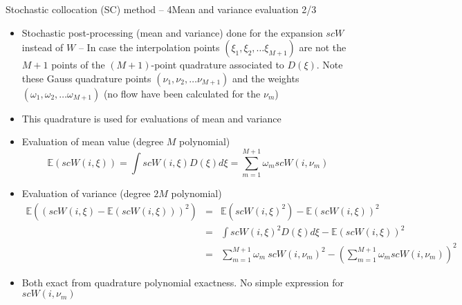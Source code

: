 \documentclass[10pt]{beamer}
\def\vr{\vspace{3mm}}
\def\begit{\begin{itemize}}
\def\endit{\end{itemize}}
\def\beas{\begin{eqnarray*}}
\def\eeas{\end{eqnarray*}}
\newcommand{\esp}{{\mathbb E}}
\begin{document}
\begin{frame}{Stochastic collocation (SC) method -- 4}{Mean and variance evaluation 2/3} 

\scriptsize{
\begit
\item Stochastic post-processing (mean and variance) done for the expansion $scW$ instead of $W$ -- In case the interpolation points $(\xi_1, \xi_2,\dots\xi_{M+1})$ are not the $M+1$ points of the $(M+1)$-point quadrature associated to $D(\xi)$. Note these Gauss quadrature points $(\nu_1, \nu_2,\dots\nu_{M+1})$ and the weights $(\omega_1, \omega_2,\dots\omega_{M+1})$ (no flow have been calculated for the $\nu_m$)
\item This quadrature is used for evaluations of mean and variance
\vr
\item Evaluation of mean value (degree $M$ polynomial)
     $$ \esp(scW(i,\xi)) = \int scW(i,\xi) D(\xi) d\xi = \sum_{m=1}^{M+1} \omega_m scW(i,\nu_m) $$
%
\item Evaluation of variance (degree $2M$ polynomial)
\beas
     \esp((scW(i,\xi)-\esp(scW(i,\xi)))^2)&=&   \esp(scW(i,\xi)^2) -\esp(scW(i,\xi))^2 \\
                 &=&   \int scW(i,\xi)^2 D(\xi)d\xi  -\esp(scW(i,\xi))^2      \\
                 &=&   \sum_{m=1}^{M+1} \omega_m \ scW(i,\nu_m)^2  - \left(\sum_{m=1}^{M+1} \omega_m scW(i, \nu_m)\right)^2
\eeas
\item Both exact from quadrature polynomial exactness. No simple expression for   $scW(i,\nu_m)$
\endit
}
%
\end{frame} 
%
\end{document}
